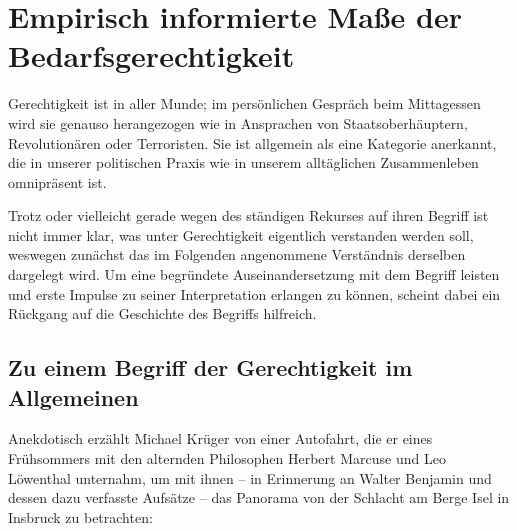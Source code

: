 \documentclass[a4paper]{thesis}
\begin{document}
\cleardoublepage
\section{Empirisch informierte Maße der Bedarfsgerechtigkeit}
\lettrine{G}{}\thickspace erechtigkeit ist in aller Munde; im persönlichen Gespräch beim Mittagessen wird sie genauso herangezogen wie in Ansprachen von Staatsoberhäuptern, Revolutionären oder Terroristen. Sie ist allgemein als eine Kategorie anerkannt, die in unserer politischen Praxis wie in unserem alltäglichen Zusammenleben omnipräsent ist.

Trotz oder vielleicht gerade wegen des ständigen Rekurses auf ihren Begriff ist nicht immer klar, was unter Gerechtigkeit eigentlich verstanden werden soll, weswegen zunächst das im Folgenden angenommene Verständnis derselben dargelegt wird. Um eine begründete Auseinandersetzung mit dem Begriff leisten und erste Impulse zu seiner Interpretation erlangen zu können, scheint dabei ein Rückgang auf die Geschichte des Begriffs hilfreich.

\subsection{Zu einem Begriff der Gerechtigkeit im Allgemeinen}
Anekdotisch erzählt Michael Krüger von einer Autofahrt, die er eines Frühsommers mit den alternden Philosophen Herbert Marcuse und Leo Löwenthal unternahm, um mit ihnen -- in Erinnerung an Walter Benjamin und dessen dazu verfasste Aufsätze -- das Panorama von der Schlacht am Berge Isel in Insbruck zu betrachten:
\end{document}

